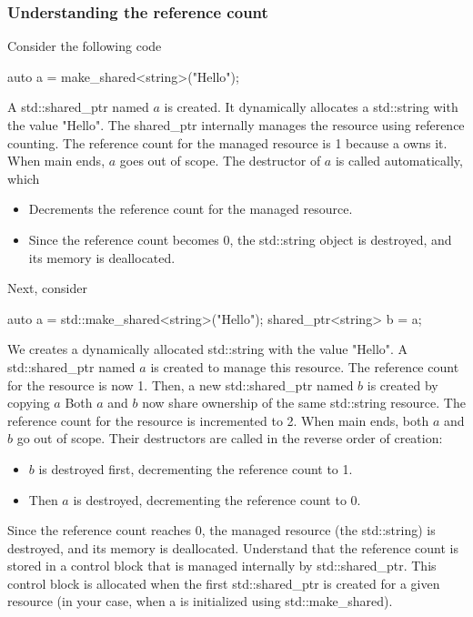 \documentclass{report}
\begin{document}
\subsubsection{Understanding the reference count}
\bigbreak \noindent 
Consider the following code
\bigbreak \noindent 
\begin{cppcode}
auto a = make_shared<string>("Hello");
\end{cppcode}
A std::shared\_ptr named $a$ is created. It dynamically allocates a std::string with the value "Hello". The shared\_ptr internally manages the resource using reference counting. The reference count for the managed resource is 1 because a owns it.
\bigbreak \noindent 
When main ends, $a$ goes out of scope. The destructor of $a$ is called automatically, which 
\begin{itemize}
    \item  Decrements the reference count for the managed resource.
    \item Since the reference count becomes 0, the std::string object is destroyed, and its memory is deallocated.
\end{itemize}
\bigbreak \noindent 
Next, consider
\bigbreak \noindent 
\begin{cppcode}
    auto a = std::make_shared<string>("Hello");
    shared_ptr<string> b = a;
\end{cppcode}
\bigbreak \noindent 
We creates a dynamically allocated std::string with the value "Hello". A std::shared\_ptr named $a$ is created to manage this resource. The reference count for the resource is now 1.
\bigbreak \noindent 
Then, a new std::shared\_ptr named $b$ is created by copying $a$ Both $a$ and $b$ now share ownership of the same std::string resource. The reference count for the resource is incremented to 2.
\bigbreak \noindent 
When main ends, both $a$ and $b$ go out of scope.
Their destructors are called in the reverse order of creation:
\begin{itemize}
    \item $b$ is destroyed first, decrementing the reference count to 1.
    \item Then $a$ is destroyed, decrementing the reference count to 0.
\end{itemize}
Since the reference count reaches 0, the managed resource (the std::string) is destroyed, and its memory is deallocated.
\bigbreak \noindent 
Understand that the reference count is stored in a control block that is managed internally by std::shared\_ptr. This control block is allocated when the first std::shared\_ptr is created for a given resource (in your case, when a is initialized using std::make\_shared).
\end{document}
